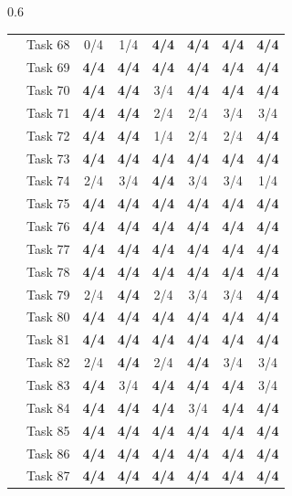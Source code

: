 \begin{table}[t]
\begin{subtable}[t]{0.6\textwidth}
\begin{tabular}{@{}llcccccc@{}}
 & Task 68 & 0/4 & 1/4 & \textbf{4/4} & \textbf{4/4} & \textbf{4/4} & \textbf{4/4} \\
 & Task 69 & \textbf{4/4} & \textbf{4/4} & \textbf{4/4} & \textbf{4/4} & \textbf{4/4} & \textbf{4/4} \\
 & Task 70 & \textbf{4/4} & \textbf{4/4} & 3/4 & \textbf{4/4} & \textbf{4/4} & \textbf{4/4} \\
 & Task 71 & \textbf{4/4} & \textbf{4/4} & 2/4 & 2/4 & 3/4 & 3/4 \\
 & Task 72 & \textbf{4/4} & \textbf{4/4} & 1/4 & 2/4 & 2/4 & \textbf{4/4} \\
 & Task 73 & \textbf{4/4} & \textbf{4/4} & \textbf{4/4} & \textbf{4/4} & \textbf{4/4} & \textbf{4/4} \\
 & Task 74 & 2/4 & 3/4 & \textbf{4/4} & 3/4 & 3/4 & 1/4 \\
 & Task 75 & \textbf{4/4} & \textbf{4/4} & \textbf{4/4} & \textbf{4/4} & \textbf{4/4} & \textbf{4/4} \\
 & Task 76 & \textbf{4/4} & \textbf{4/4} & \textbf{4/4} & \textbf{4/4} & \textbf{4/4} & \textbf{4/4} \\
 & Task 77 & \textbf{4/4} & \textbf{4/4} & \textbf{4/4} & \textbf{4/4} & \textbf{4/4} & \textbf{4/4} \\
 & Task 78 & \textbf{4/4} & \textbf{4/4} & \textbf{4/4} & \textbf{4/4} & \textbf{4/4} & \textbf{4/4} \\
 & Task 79 & 2/4 & \textbf{4/4} & 2/4 & 3/4 & 3/4 & \textbf{4/4} \\
 & Task 80 & \textbf{4/4} & \textbf{4/4} & \textbf{4/4} & \textbf{4/4} & \textbf{4/4} & \textbf{4/4} \\
 & Task 81 & \textbf{4/4} & \textbf{4/4} & \textbf{4/4} & \textbf{4/4} & \textbf{4/4} & \textbf{4/4} \\
 & Task 82 & 2/4 & \textbf{4/4} & 2/4 & \textbf{4/4} & 3/4 & 3/4 \\
 & Task 83 & \textbf{4/4} & 3/4 & \textbf{4/4} & \textbf{4/4} & \textbf{4/4} & 3/4 \\
 & Task 84 & \textbf{4/4} & \textbf{4/4} & \textbf{4/4} & 3/4 & \textbf{4/4} & \textbf{4/4} \\
 & Task 85 & \textbf{4/4} & \textbf{4/4} & \textbf{4/4} & \textbf{4/4} & \textbf{4/4} & \textbf{4/4} \\
 & Task 86 & \textbf{4/4} & \textbf{4/4} & \textbf{4/4} & \textbf{4/4} & \textbf{4/4} & \textbf{4/4} \\
 & Task 87 & \textbf{4/4} & \textbf{4/4} & \textbf{4/4} & \textbf{4/4} & \textbf{4/4} & \textbf{4/4} \\

\end{tabular}
\end{subtable}
\end{table}
